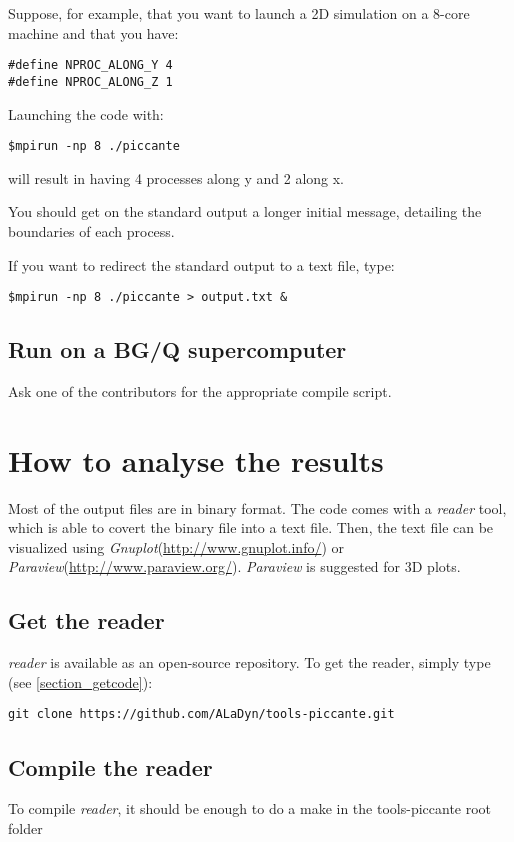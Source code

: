 \documentclass[11pt,a4paper]{report}
\begin{document}
Suppose, for example, that you want to launch a 2D simulation on a 8-core machine and that you have:
\begin{lstlisting}
#define NPROC_ALONG_Y 4
#define NPROC_ALONG_Z 1
\end{lstlisting}
Launching the code with:
\begin{verbatim}
$mpirun -np 8 ./piccante
\end{verbatim}
will result in having 4 processes along y and 2 along x.

You should get on the standard output a longer initial message, detailing the boundaries of each process.

If you want to redirect the standard output to a text file, type:

\begin{verbatim}
$mpirun -np 8 ./piccante > output.txt &
\end{verbatim}

\section{Run on a BG/Q supercomputer}
Ask one of the contributors for the appropriate compile script.

\chapter{How to analyse the results}\label{chapter_howtoanalyse}
Most of the output files are in binary format. The code comes with a \emph{reader} tool, which is able to covert the binary file into a text file. Then, the text file can be visualized using \emph{Gnuplot}(\url{http://www.gnuplot.info/}) or \emph{Paraview}(\url{http://www.paraview.org/}). \emph{Paraview} is suggested for 3D plots.

\section{Get the reader}
\emph{reader} is available as an open-source repository. To get the reader, simply type (see \ref{section_getcode}):
\begin{verbatim}
git clone https://github.com/ALaDyn/tools-piccante.git
\end{verbatim}

\section{Compile the reader}
To compile \emph{reader}, it should be enough to do a make in the tools-piccante root folder
\end{document}

